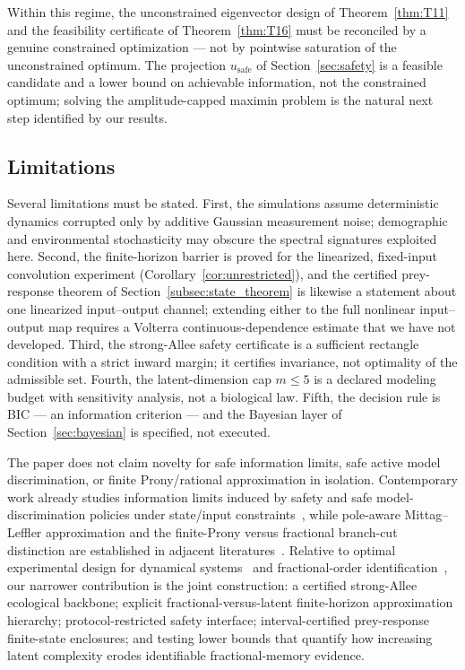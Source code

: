 Within this regime, the unconstrained eigenvector design of Theorem~\ref{thm:T11} and the feasibility certificate of Theorem~\ref{thm:T16} must be reconciled by a genuine constrained optimization --- not by pointwise saturation of the unconstrained optimum. The projection $u_{\mathrm{safe}}$ of Section~\ref{sec:safety} is a feasible candidate and a lower bound on achievable information, not the constrained optimum; solving the amplitude-capped maximin problem is the natural next step identified by our results.

\subsection{Limitations}

Several limitations must be stated. First, the simulations assume deterministic dynamics corrupted only by additive Gaussian measurement noise; demographic and environmental stochasticity may obscure the spectral signatures exploited here. Second, the finite-horizon barrier is proved for the linearized, fixed-input convolution experiment (Corollary~\ref{cor:unrestricted}), and the certified prey-response theorem of Section~\ref{subsec:state_theorem} is likewise a statement about one linearized input--output channel; extending either to the full nonlinear input--output map requires a Volterra continuous-dependence estimate that we have not developed. Third, the strong-Allee safety certificate is a sufficient rectangle condition with a strict inward margin; it certifies invariance, not optimality of the admissible set. Fourth, the latent-dimension cap $m \le 5$ is a declared modeling budget with sensitivity analysis, not a biological law. Fifth, the decision rule is BIC --- an information criterion --- and the Bayesian layer of Section~\ref{sec:bayesian} is specified, not executed.

The paper does not claim novelty for safe information limits, safe active model discrimination, or finite Prony/rational approximation in isolation. Contemporary work already studies information limits induced by safety and safe model-discrimination policies under state/input constraints~\cite{SAFE26A,SAFE26B}, while pole-aware Mittag--Leffler approximation and the finite-Prony versus fractional branch-cut distinction are established in adjacent literatures~\cite{ML01,PRONY26}. Relative to optimal experimental design for dynamical systems~\cite{O01,O05} and fractional-order identification~\cite{I02,F02}, our narrower contribution is the joint construction: a certified strong-Allee ecological backbone; explicit fractional-versus-latent finite-horizon approximation hierarchy; protocol-restricted safety interface; interval-certified prey-response finite-state enclosures; and testing lower bounds that quantify how increasing latent complexity erodes identifiable fractional-memory evidence.

